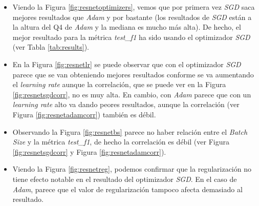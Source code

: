 \begin{itemize}
    \item Viendo la Figura \ref{fig:resnetoptimizers}, vemos que por primera vez \textit{SGD} saca mejores resultados que \textit{Adam} y por bastante (los resultados de \textit{SGD} están a la altura del Q4 de \textit{Adam} y la mediana es mucho más alta). De hecho, el mejor resultado para la métrica \textit{test\_f1} ha sido usando el optimizador \textit{SGD} (ver Tabla \ref{tab:results}).
    \item En la Figura \ref{fig:resnetlr} se puede observar que con el optimizador \textit{SGD} parece que se van obteniendo mejores resultados conforme se va aumentando el \textit{learning rate} aunque la correlación, que se puede ver en la Figura \ref{fig:resnetsgdcorr}, no es muy alta. En cambio, con \textit{Adam} parece que con un \textit{learning rate} alto va dando peores resultados, aunque la correlación (ver Figura \ref{fig:resnetadamcorr}) también es débil.
    \item Observando la Figura \ref{fig:resnetbs} parece no haber relación entre el \textit{Batch Size} y la métrica \textit{test\_f1}, de hecho la correlación es débil (ver Figura \ref{fig:resnetsgdcorr} y Figura \ref{fig:resnetadamcorr}).
    \item Viendo la Figura \ref{fig:resnetreg}, podemos confirmar que la regularización no tiene efecto notable en el resultado del optimizador \textit{SGD}. En el caso de \textit{Adam}, parece que el valor de regularización tampoco afecta demasiado al resultado.
\end{itemize}

